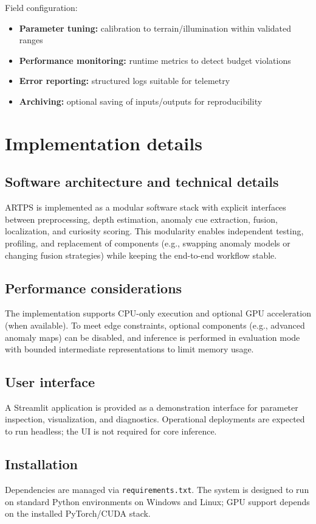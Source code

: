 \documentclass[12pt]{article}
\begin{document}
Field configuration:
\begin{itemize}
\item \textbf{Parameter tuning:} calibration to terrain/illumination within validated ranges
\item \textbf{Performance monitoring:} runtime metrics to detect budget violations
\item \textbf{Error reporting:} structured logs suitable for telemetry
\item \textbf{Archiving:} optional saving of inputs/outputs for reproducibility
\end{itemize}

\section{Implementation details}

\subsection{Software architecture and technical details}
ARTPS is implemented as a modular software stack with explicit interfaces between preprocessing, depth estimation, anomaly cue extraction, fusion, localization, and curiosity scoring. This modularity enables independent testing, profiling, and replacement of components (e.g., swapping anomaly models or changing fusion strategies) while keeping the end-to-end workflow stable.

\subsection{Performance considerations}
The implementation supports CPU-only execution and optional GPU acceleration (when available). To meet edge constraints, optional components (e.g., advanced anomaly maps) can be disabled, and inference is performed in evaluation mode with bounded intermediate representations to limit memory usage.

\subsection{User interface}
A Streamlit application is provided as a demonstration interface for parameter inspection, visualization, and diagnostics. Operational deployments are expected to run headless; the UI is not required for core inference.

\subsection{Installation}
Dependencies are managed via \texttt{requirements.txt}. The system is designed to run on standard Python environments on Windows and Linux; GPU support depends on the installed PyTorch/CUDA stack.
\end{document}
